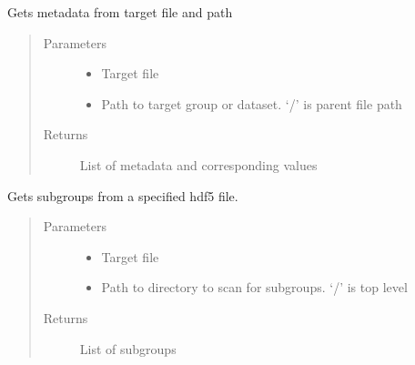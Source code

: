 \documentclass[letterpaper,10pt,english]{sphinxmanual}
\begin{document}
\begin{fulllineitems}
\label{\detokenize{index:HDF5Methods.getMetadata}}
\sphinxAtStartPar
Gets metadata from target file and path
\begin{quote}\begin{description}
\item[{Parameters}] \leavevmode\begin{itemize}
\item {} 
\sphinxAtStartPar
{} \textendash{} Target file

\item {} 
\sphinxAtStartPar
{} \textendash{} Path to target group or dataset. ‘/’ is parent file path

\end{itemize}

\item[{Returns}] \leavevmode
\sphinxAtStartPar
List of metadata and corresponding values

\end{description}\end{quote}

\end{fulllineitems}


\begin{fulllineitems}
\label{\detokenize{index:HDF5Methods.getSubGroups}}
\sphinxAtStartPar
Gets subgroups from a specified hdf5 file.
\begin{quote}\begin{description}
\item[{Parameters}] \leavevmode\begin{itemize}
\item {} 
\sphinxAtStartPar
{} \textendash{} Target file

\item {} 
\sphinxAtStartPar
{} \textendash{} Path to directory to scan for subgroups. ‘/’ is top level

\end{itemize}

\item[{Returns}] \leavevmode
\sphinxAtStartPar
List of subgroups

\end{description}\end{quote}

\end{fulllineitems}
\end{document}
